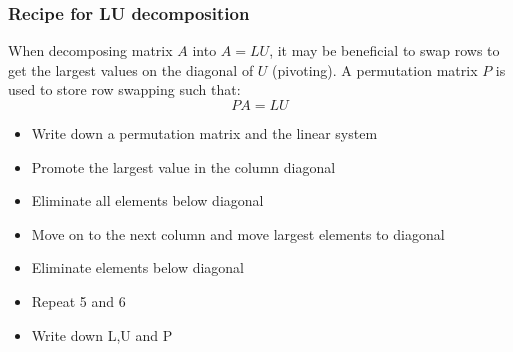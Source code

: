 % 

\begin{frame}[fragile]
  \frametitle{Recipe for LU decomposition}
   When decomposing matrix $A$ into $A=LU$, it may be beneficial to swap rows to get the largest values on the diagonal of $U$ (pivoting). A permutation matrix $P$ is used to store row swapping such that:
   \[
    PA = LU
   \]
  \begin{itemize}
    \item Write down a permutation matrix and the linear system
    \item Promote the largest value in the column diagonal
    \item Eliminate all elements below diagonal
    \item Move on to the next column and move largest elements to diagonal
    \item Eliminate elements below diagonal
    \item Repeat 5 and 6
    \item Write down L,U and P
  \end{itemize}
\end{frame}

